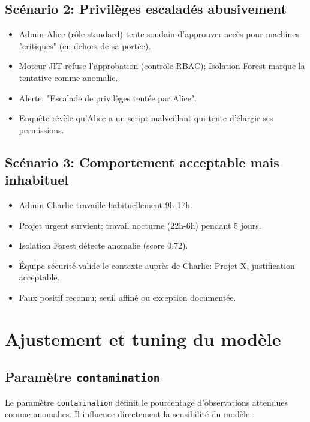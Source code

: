 \subsection{Scénario 2: Privilèges escaladés abusivement}

\begin{itemize}
	\item Admin Alice (rôle standard) tente soudain d'approuver accès pour machines "critiques" (en-dehors de sa portée).
	\item Moteur JIT refuse l'approbation (contrôle RBAC); Isolation Forest marque la tentative comme anomalie.
	\item Alerte: "Escalade de privilèges tentée par Alice".
	\item Enquête révèle qu'Alice a un script malveillant qui tente d'élargir ses permissions.
\end{itemize}

\subsection{Scénario 3: Comportement acceptable mais inhabituel}

\begin{itemize}
	\item Admin Charlie travaille habituellement 9h-17h.
	\item Projet urgent survient; travail nocturne (22h-6h) pendant 5 jours.
	\item Isolation Forest détecte anomalie (score 0.72).
	\item Équipe sécurité valide le contexte auprès de Charlie: Projet X, justification acceptable.
	\item Faux positif reconnu; seuil affiné ou exception documentée.
\end{itemize}

\section{Ajustement et tuning du modèle}

\subsection{Paramètre \texttt{contamination}}

Le paramètre \texttt{contamination} définit le pourcentage d'observations attendues comme anomalies.
Il influence directement la sensibilité du modèle:

